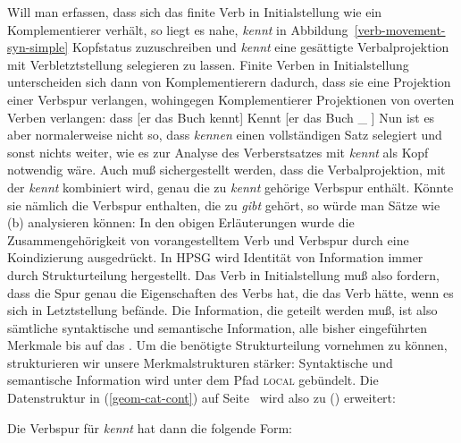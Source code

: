 Will man erfassen, dass sich das finite Verb in Initialstellung wie ein Komplementierer verhält, so liegt
es nahe, \emph{kennt} in Abbildung~\ref{verb-movement-syn-simple} Kopfstatus zuzuschreiben und
\emph{kennt} eine gesättigte Verbalprojektion mit Verbletztstellung selegieren zu lassen.
Finite Verben in Initialstellung unterscheiden sich dann von Komplementierern dadurch,
dass sie eine Projektion einer Verbspur verlangen, wohingegen Komplementierer Projektionen
von overten Verben verlangen:
\eal
\ex dass [er das Buch kennt]
\ex Kennt [er das Buch \_ ]
\zl
Nun ist es aber normalerweise nicht so, dass \emph{kennen}
einen vollständigen Satz selegiert und sonst nichts weiter, wie es zur Analyse des Verberstsatzes
mit \emph{kennt} als Kopf notwendig wäre. Auch muß sichergestellt werden, dass die Verbalprojektion,
mit der \emph{kennt} kombiniert wird, genau die zu \emph{kennt} gehörige Verbspur enthält. Könnte
sie nämlich die Verbspur enthalten, die zu \emph{gibt} gehört, so würde man Sätze wie (b)
analysieren können:
\eal
{}
\zl
In den obigen Erläuterungen wurde die Zusammengehörigkeit von vorangestelltem Verb und Verbspur
durch eine Koindizierung ausgedrückt. In HPSG wird Identität von Information immer durch Strukturteilung
hergestellt. Das Verb in Initialstellung muß also fordern, dass die Spur genau die Eigenschaften des
Verbs hat, die das Verb hätte, wenn es sich in Letztstellung befände. Die Information, die geteilt
werden muß, ist also sämtliche syntaktische und semantische Information, \dash alle bisher eingeführten
Merkmale bis auf das \phonm. Um die benötigte Strukturteilung vornehmen zu können, strukturieren
wir unsere Merkmalstrukturen stärker: Syntaktische und semantische Information wird unter dem
Pfad \textsc{local} gebündelt. Die Datenstruktur in (\ref{geom-cat-cont}) auf Seite~\pageref{geom-cat-cont}
wird also zu () erweitert:
\ea
\label{geom-loc}
\z

\noindent
Die Verbspur für \emph{kennt} hat dann die folgende Form:

